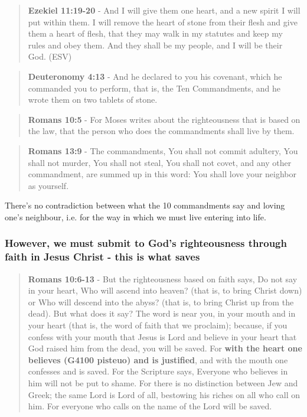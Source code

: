 \documentclass[11pt]{article}
\begin{document}
\begin{quote}
\textbf{Ezekiel 11:19-20} - And I will give them one heart, and a new spirit I will put within them. I will remove the heart of stone from their flesh and give them a heart of flesh, that they may walk in my statutes and keep my rules and obey them. And they shall be my people, and I will be their God. (ESV)
\end{quote}

\begin{quote}
\textbf{Deuteronomy 4:13} - And he declared to you his covenant, which he commanded you to perform, that is, the Ten Commandments, and he wrote them on two tablets of stone.
\end{quote}

\begin{quote}
\textbf{Romans 10:5} - For Moses writes about the righteousness that is based on the law, that the person who does the commandments shall live by them.
\end{quote}

\begin{quote}
\textbf{Romans 13:9} - The commandments, You shall not commit adultery, You shall not murder, You shall not steal, You shall not covet, and any other commandment, are summed up in this word: You shall love your neighbor as yourself.
\end{quote}

There's no contradiction between what the 10 commandments say and loving one's neighbour, i.e. for the way in which we must live entering into life.

\subsubsection{However, we must submit to God's righteousness through faith in Jesus Christ - this is what saves}
\label{sec:org948c23c}
\begin{quote}
\textbf{Romans 10:6-13} - But the righteousness based on faith says, Do not say in your heart, Who will ascend into heaven? (that is, to bring Christ down) or Who will descend into the abyss? (that is, to bring Christ up from the dead).  But what does it say? The word is near you, in your mouth and in your heart (that is, the word of faith that we proclaim); because, if you confess with your mouth that Jesus is Lord and believe in your heart that God raised him from the dead, you will be saved.  For \textbf{with the heart one believes (G4100 pisteuo) and is justified}, and with the mouth one confesses and is saved.  For the Scripture says, Everyone who believes in him will not be put to shame.  For there is no distinction between Jew and Greek; the same Lord is Lord of all, bestowing his riches on all who call on him.  For everyone who calls on the name of the Lord will be saved.
\end{quote}
\end{document}
